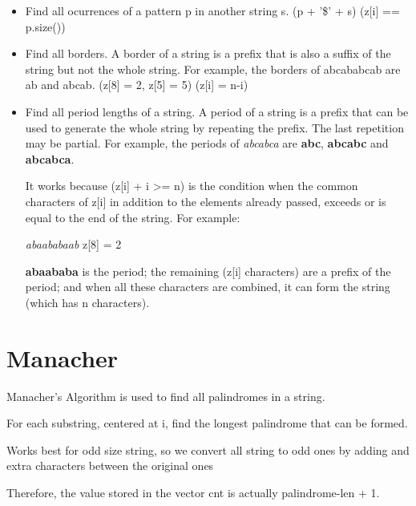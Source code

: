     \begin{itemize}
		\item Find all ocurrences of a pattern p in another string s. 
        (p + '\$' + s) (z[i] == p.size())

        \item Find all borders. A border of a string is a prefix that is also a suffix of 
        the string but not the whole string. 
        For example, the borders of abcababcab are ab and abcab. (z[8] = 2, z[5] = 5)
        (z[i] = n-i)

        \item Find all period lengths of a string. 
        A period of a string is a prefix that can be used to generate the whole string by repeating
        the prefix. The last repetition may be partial. For example, the periods of \textit{abcabca} 
        are \textbf{abc}, \textbf{abcabc} and \textbf{abcabca}.

        It works because (z[i] + i >= n) is the condition when the common characters of z[i] in addition
        to the elements already passed, exceeds or is equal to the end of the string. For example:

        \textit{abaababaab}
        z[8] = 2

        \textbf{abaababa} is the period; the remaining (z[i] characters) are a prefix of the period; 
        and when all these characters are combined, it can form the string (which has n characters).

	\end{itemize}


\section{Manacher}

    Manacher's Algorithm is used to find all palindromes in a string.

    For each substring, centered at i, find the longest palindrome that can be formed.
    
    Works best for odd size string, so we convert all string to odd ones
    by adding and extra characters between the original ones

    Therefore, the value stored in the vector cnt is actually palindrome-len + 1.

